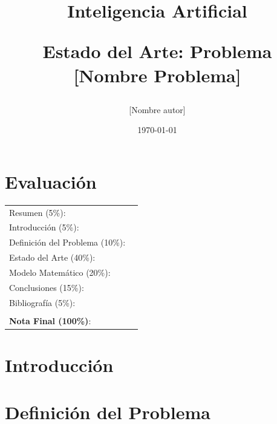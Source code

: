 \documentclass[letter, 10pt]{article}
\begin{document}
\title{Inteligencia Artificial \\ \begin{Large}Estado del Arte: Problema [Nombre Problema]\end{Large}}
\author{[Nombre autor]}
\date{\today}
\maketitle


\section*{Evaluaci\'on}

\begin{tabular}{ll}
Resumen (5\%): & \underline{\hspace{2cm}} \\
Introducci\'on (5\%):  & \underline{\hspace{2cm}} \\
Definici\'on del Problema (10\%):  & \underline{\hspace{2cm}} \\
Estado del Arte (40\%):  & \underline{\hspace{2cm}} \\
Modelo Matem\'atico (20\%): &  \underline{\hspace{2cm}}\\
Conclusiones (15\%): &  \underline{\hspace{2cm}}\\
Bibliograf\'ia (5\%): & \underline{\hspace{2cm}}\\
 &  \\
\textbf{Nota Final (100\%)}:   & \underline{\hspace{2cm}}
\end{tabular}
\vspace{2cm}

\begin{abstract}

\end{abstract}

\section{Introducci\'on}


\section{Definici\'on del Problema}

\end{document}
